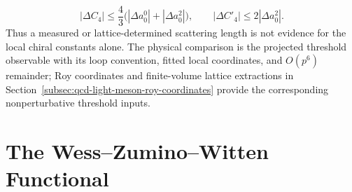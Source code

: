 \begin{controlledapproximation}
\begin{equation}
  |\Delta C_4|
  \le
  \frac43\bigl(|\Delta a_0^0|+|\Delta a_0^2|\bigr),
  \qquad
  |\Delta C'_4|
  \le
  2|\Delta a_0^2|.
  \label{eq:chpt-threshold-lec-residual-shift-bound}
\end{equation}
Thus a measured or lattice-determined scattering length is not evidence for the
local chiral constants alone.  The physical comparison is the projected
threshold observable with its loop convention, fitted local coordinates, and
\(O(p^6)\) remainder; Roy coordinates and finite-volume lattice extractions in
Section~\ref{subsec:qcd-light-meson-roy-coordinates} provide the corresponding
nonperturbative threshold inputs.
\end{controlledapproximation}

\section{The Wess--Zumino--Witten Functional}

